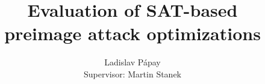 \documentclass[myposter,portrait]{sciposter}
\begin{document}
\setlength{\logowidth}{20cm}
\setlength{\titlewidth}{\textwidth}
\addtolength{\titlewidth}{-\logowidth}
\useleftlogofalse


\title{Evaluation of SAT-based\\ preimage attack optimizations}
\author{Ladislav P\'apay\\
        Supervisor: Martin Stanek}
\maketitle

\end{document}
